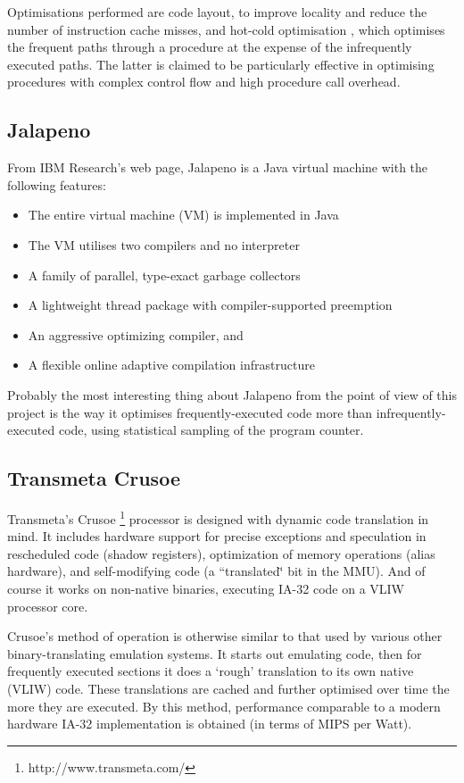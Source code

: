 Optimisations performed are code layout, to improve locality and reduce
the number of instruction cache misses, and hot-cold optimisation
\cite{CL 96}, which optimises the frequent paths through a procedure
at the expense of the infrequently executed paths. The latter is claimed
to be particularly effective in optimising procedures with complex
control flow and high procedure call overhead.


\subsection{Jalapeno}

From IBM Research's web page, Jalapeno is a Java virtual machine with
the following features:

\begin{itemize}
\item The entire virtual machine (VM) is implemented in Java
\item The VM utilises two compilers and no interpreter
\item A family of parallel, type-exact garbage collectors
\item A lightweight thread package with compiler-supported preemption
\item An aggressive optimizing compiler, and
\item A flexible online adaptive compilation infrastructure
\end{itemize}
Probably the most interesting thing about Jalapeno from the point
of view of this project is the way it optimises frequently-executed
code more than infrequently-executed code, using statistical sampling
of the program counter.


\subsection{Transmeta Crusoe}

Transmeta's Crusoe%
\footnote{http://www.transmeta.com/%
} processor is designed with dynamic code translation in mind. It includes
hardware support for precise exceptions and speculation in rescheduled
code (shadow registers), optimization of memory operations (alias
hardware), and self-modifying code (a ``translated\char`\"{} bit in
the MMU). And of course it works on non-native binaries, executing
IA-32 code on a VLIW processor core.

Crusoe's method of operation is otherwise similar to that used by various other binary-translating emulation systems. It starts out emulating code, then for frequently executed sections it does a `rough' translation to its own native (VLIW) code. These translations are cached and further optimised over time the more they are executed. By this method, performance comparable to a modern hardware IA-32 implementation is obtained (in terms of MIPS per Watt).

